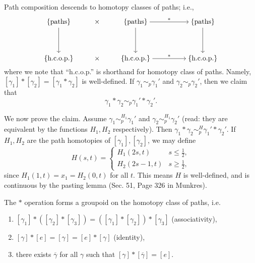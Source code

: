 \newpage
\begin{simpleclaim}
    Path composition descends to homotopy classes of paths; i.e.,
    \[\begin{tikzcd}[ampersand replacement=\&,cramped]
        {\{\text{paths}\}} \& \times \& {\{\text{paths}\}} \&\& {\{\text{paths}\}} \\
        \\
        {\{\text{h.c.o.p.}\}} \& \times \& {\{\text{h.c.o.p.}\}} \&\& {\{\text{h.c.o.p.}\}}
        \arrow[from=1-1, to=3-1]
        \arrow["\ast", from=1-3, to=1-5]
        \arrow[from=1-3, to=3-3]
        \arrow[from=1-5, to=3-5]
        \arrow["\ast", from=3-3, to=3-5]
    \end{tikzcd}\]
    where we note that ``h.c.o.p.'' is shorthand for homotopy class of paths. Namely, $[\gamma_1] \ast [\gamma_2] = [\gamma_1 \ast \gamma_2]$ is well-defined. If $\gamma_1 \sim_p \gamma_1'$ and $\gamma_2 \sim_p \gamma_2'$, then we claim that
\[ \gamma_1 \ast \gamma_2 \sim_p \gamma_1' \ast \gamma_2'. \]
\end{simpleclaim}
\noindent We now prove the claim. Assume $\gamma_1 \sim_p^{H_1} \gamma_1'$ and $\gamma_2 \sim_p^{H_1} \gamma_2'$ (read: they are equivalent by the functions $H_1, H_2$ respectively). Then $\gamma_1 \ast \gamma_2 \sim_p^H \gamma_1' \ast \gamma_2'$. If $H_1, H_2$ are the path homotopies of $[\gamma_1], [\gamma_2]$, we may define
\[ H(s, t) = \begin{cases} H_1(2s, t) & s \leq \frac{1}{2}, \\ H_2(2s - 1, t) & s \geq \frac{1}{2}, \end{cases} \]
since $H_1(1, t) = x_1 = H_2(0, t)$ for all $t$. This means $H$ is well-defined, and is continuous by the pasting lemma (Sec. 51, Page 326 in Munkres).
\begin{simplethm}
    The $\ast$ operation forms a groupoid on the homotopy class of paths, i.e.
    \begin{enumerate}[label=(\alph*)]
        \item $[\gamma_1] \ast ([\gamma_2] \ast [\gamma_3]) = ([\gamma_1] \ast [\gamma_2]) \ast [\gamma_3]$ (associativity),
        \item $[\gamma] \ast [e] = [\gamma] = [e] \ast [\gamma]$ (identity),
        \item there exists $\overline{\gamma}$ for all $\gamma$ such that $[\gamma] \ast [\overline{\gamma}] = [e]$.
    \end{enumerate}
\end{simplethm}
